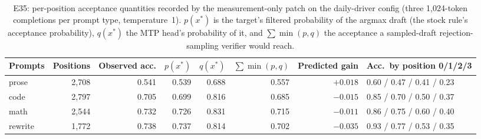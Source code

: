 \documentclass[11pt]{article}
\begin{document}
\begin{table}[htbp]
\centering
\scriptsize
\begin{tabular}{lrrrrrrl}
\toprule
Prompts & Positions & Observed acc. & $p(x^*)$ & $q(x^*)$ & $\sum\min(p,q)$ & Predicted gain & Acc.\ by position 0/1/2/3 \\
\midrule
prose & 2,708 & 0.541 & 0.539 & 0.688 & 0.557 & $+0.018$ & 0.60 / 0.47 / 0.41 / 0.23 \\
code & 2,797 & 0.705 & 0.699 & 0.816 & 0.685 & $-0.015$ & 0.85 / 0.70 / 0.50 / 0.37 \\
math & 2,544 & 0.732 & 0.726 & 0.831 & 0.715 & $-0.011$ & 0.86 / 0.75 / 0.60 / 0.40 \\
rewrite & 1,772 & 0.738 & 0.737 & 0.814 & 0.702 & $-0.035$ & 0.93 / 0.77 / 0.53 / 0.35 \\
\bottomrule
\end{tabular}
\caption{E35: per-position acceptance quantities recorded by the
measurement-only patch on the daily-driver config (three 1,024-token
completions per prompt type, temperature~1). $p(x^*)$ is the target's
filtered probability of the argmax draft (the stock rule's acceptance
probability), $q(x^*)$ the MTP head's probability of it, and $\sum\min(p,q)$
the acceptance a sampled-draft rejection-sampling verifier would reach.}
\label{tab:specmeas}
\end{table}
\end{document}
